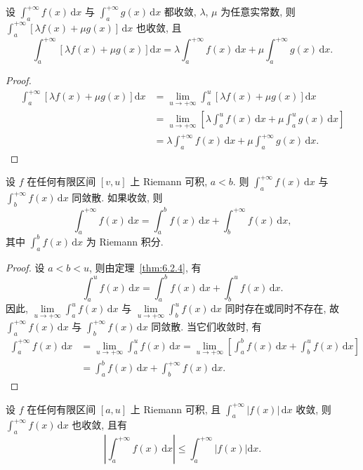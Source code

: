 \begin{lemma}\label{lem:6.5.1}
设 $\int_{a}^{+\infty}f(x)\,\mathrm{d}x$ 与 $\int_{a}^{+\infty}g(x)\,\mathrm{d}x$ 都收敛, $\lambda$, $\mu$ 为任意实常数, 则 $\int_{a}^{+\infty}[\lambda f(x)+\mu g(x)]\,\mathrm{d}x$ 也收敛, 且
\[
\int_{a}^{+\infty}\left[\lambda f(x)+\mu g(x)\right]\mathrm{d}x=\lambda\int_{a}^{+\infty}f(x)\,\mathrm{d}x+\mu\int_{a}^{+\infty}g(x)\,\mathrm{d}x.
\]
\end{lemma}

\begin{proof}
\begin{align*}
\int_{a}^{+\infty}\left[\lambda f(x)+\mu g(x)\right]\mathrm{d}x&=\lim_{u\to+\infty}\int_{a}^{u}\left[\lambda f(x)+\mu g(x)\right]\mathrm{d}x\\
&=\lim_{u\to+\infty}\left[\lambda\int_{a}^{u}f(x)\,\mathrm{d}x+\mu\int_{a}^{u}g(x)\,\mathrm{d}x\right]\\
&=\lambda\int_{a}^{+\infty}f(x)\,\mathrm{d}x+\mu\int_{a}^{+\infty}g(x)\,\mathrm{d}x.
\end{align*}
\end{proof}

\begin{lemma}\label{lem:6.5.2}
设 $f$ 在任何有限区间 $[v,u]$ 上 Riemann 可积, $a<b$. 则 $\int_{a}^{+\infty}f(x)\,\mathrm{d}x$ 与 $\int_{b}^{+\infty}f(x)\,\mathrm{d}x$ 同敛散. 如果收敛, 则
\[
\int_{a}^{+\infty}f(x)\,\mathrm{d}x=\int_{a}^{b}f(x)\,\mathrm{d}x+\int_{b}^{+\infty}f(x)\,\mathrm{d}x,
\]
其中 $\int_{a}^{b}f(x)\,\mathrm{d}x$ 为 Riemann 积分.
\end{lemma}

\begin{proof}
设 $a<b<u$, 则由定理~\ref{thm:6.2.4}, 有
\[
\int_{a}^{u}f(x)\,\mathrm{d}x=\int_{a}^{b}f(x)\,\mathrm{d}x+\int_{b}^{u}f(x)\,\mathrm{d}x.
\]
因此, $\lim\limits_{u\to+\infty}\int_{a}^{u}f(x)\,\mathrm{d}x$ 与 $\lim\limits_{u\to+\infty}\int_{b}^{u}f(x)\,\mathrm{d}x$ 同时存在或同时不存在, 故 $\int_{a}^{+\infty}f(x)\,\mathrm{d}x$ 与 $\int_{b}^{+\infty}f(x)\,\mathrm{d}x$ 同敛散. 当它们收敛时, 有
\begin{align*}
\int_{a}^{+\infty}f(x)\,\mathrm{d}x&=\lim_{u\to+\infty}\int_{a}^{u}f(x)\,\mathrm{d}x=\lim_{u\to+\infty}\left[\int_{a}^{b}f(x)\,\mathrm{d}x+\int_{b}^{u}f(x)\,\mathrm{d}x\right]\\
&=\int_{a}^{b}f(x)\,\mathrm{d}x+\int_{b}^{+\infty}f(x)\,\mathrm{d}x.
\end{align*}
\end{proof}

\begin{lemma}\label{lem:6.5.3}
设 $f$ 在任何有限区间 $[a,u]$ 上 Riemann 可积, 且 $\int_{a}^{+\infty}|f(x)|\,\mathrm{d}x$ 收敛, 则 $\int_{a}^{+\infty}f(x)\,\mathrm{d}x$ 也收敛, 且有
\[
\left|\int_{a}^{+\infty}f(x)\,\mathrm{d}x\right|\leqslant\int_{a}^{+\infty}\left|f(x)\right|\mathrm{d}x.
\]
\end{lemma}

